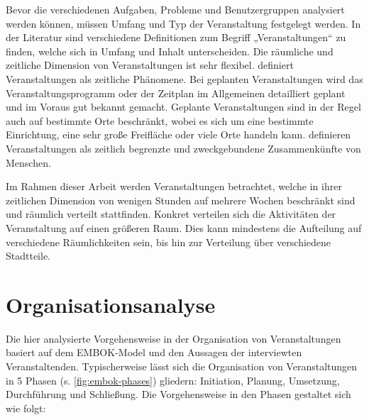 Bevor die verschiedenen Aufgaben, Probleme und Benutzergruppen analysiert werden
können, müssen Umfang und Typ der Veranstaltung festgelegt werden. In der
Literatur sind verschiedene Definitionen zum Begriff „Veranstaltungen“ zu
finden, welche sich in Umfang und Inhalt unterscheiden. Die räumliche und
zeitliche Dimension von Veranstaltungen ist sehr flexibel. \textcite{Getz2007}
definiert Veranstaltungen als zeitliche Phänomene. Bei geplanten Veranstaltungen
wird das Veranstaltungsprogramm oder der Zeitplan im Allgemeinen detailliert
geplant und im Voraus gut bekannt gemacht. Geplante Veranstaltungen sind in der
Regel auch auf bestimmte Orte beschränkt, wobei es sich um eine bestimmte
Einrichtung, eine sehr große Freifläche oder viele Orte handeln kann.
\textcite{Bladen2012} definieren Veranstaltungen als zeitlich begrenzte und
zweckgebundene Zusammenkünfte von Menschen.

Im Rahmen dieser Arbeit werden Veranstaltungen betrachtet, welche in ihrer
zeitlichen Dimension von wenigen Stunden auf mehrere Wochen beschränkt sind und
räumlich verteilt stattfinden. Konkret verteilen sich die Aktivitäten der
Veranstaltung auf einen größeren Raum. Dies kann mindestens die Aufteilung auf
verschiedene Räumlichkeiten sein, bis hin zur Verteilung über verschiedene
Stadtteile.


\section{Organisationsanalyse} \label{sec:analysis-org}

Die hier analysierte Vorgehensweise in der Organisation von Veranstaltungen
basiert auf dem EMBOK-Model \cite{Silvers2013} und den Aussagen der interviewten
Veranstaltenden. Typischerweise lässt sich die Organisation von Veranstaltungen
in 5 Phasen (s. \autoref{fig:embok-phases}) gliedern: Initiation, Planung,
Umsetzung, Durchführung und Schließung. Die Vorgehensweise in den Phasen
gestaltet sich wie folgt:

